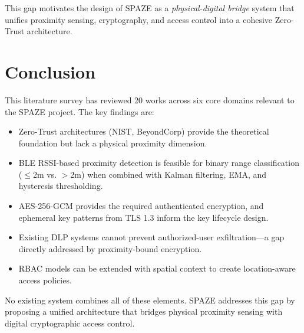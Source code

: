 \documentclass[conference]{IEEEtran}
\begin{document}
This gap motivates the design of SPAZE as a \textit{physical-digital bridge} system that unifies proximity sensing, cryptography, and access control into a cohesive Zero-Trust architecture.

\section{Conclusion}

This literature survey has reviewed 20 works across six core domains relevant to the SPAZE project. The key findings are:

\begin{itemize}[noitemsep]
    \item Zero-Trust architectures (NIST, BeyondCorp) provide the theoretical foundation but lack a physical proximity dimension.
    \item BLE RSSI-based proximity detection is feasible for binary range classification ($\leq$2m vs. $>$2m) when combined with Kalman filtering, EMA, and hysteresis thresholding.
    \item AES-256-GCM provides the required authenticated encryption, and ephemeral key patterns from TLS 1.3 inform the key lifecycle design.
    \item Existing DLP systems cannot prevent authorized-user exfiltration—a gap directly addressed by proximity-bound encryption.
    \item RBAC models can be extended with spatial context to create location-aware access policies.
\end{itemize}

No existing system combines all of these elements. SPAZE addresses this gap by proposing a unified architecture that bridges physical proximity sensing with digital cryptographic access control.
\end{document}
